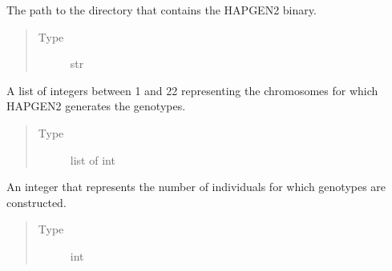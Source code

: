 \documentclass[a4paper,10pt,english]{sphinxhowto}
\begin{document}
\begin{fulllineitems}
\begin{fulllineitems}
\label{\detokenize{utils:utils.genotype_corpus_generator.GenotypeCorpusGenerator.hapgen_dir}}
The path to the directory that contains the HAPGEN2 binary.
\begin{quote}\begin{description}
\item[{Type}] \leavevmode
str

\end{description}\end{quote}

\end{fulllineitems}


\begin{fulllineitems}
\label{\detokenize{utils:utils.genotype_corpus_generator.GenotypeCorpusGenerator.chroms}}
A list of integers between 1 and 22 representing the chromosomes
for which HAPGEN2 generates the genotypes.
\begin{quote}\begin{description}
\item[{Type}] \leavevmode
list of int

\end{description}\end{quote}

\end{fulllineitems}


\begin{fulllineitems}
\label{\detokenize{utils:utils.genotype_corpus_generator.GenotypeCorpusGenerator.num_inds}}
An integer that represents the number of individuals for which
genotypes are constructed.
\begin{quote}\begin{description}
\item[{Type}] \leavevmode
int

\end{description}\end{quote}


\end{fulllineitems}
\end{fulllineitems}
\end{document}
